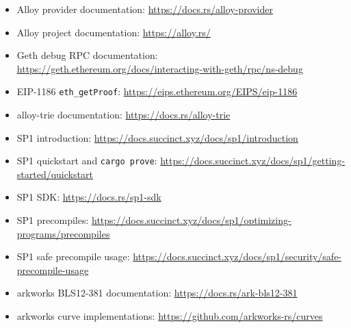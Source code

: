 \documentclass[UTF8,a4paper,11pt]{ctexart}
\begin{document}
\begin{itemize}[leftmargin=2em]
  \item Alloy provider documentation: \url{https://docs.rs/alloy-provider}
  \item Alloy project documentation: \url{https://alloy.rs/}
  \item Geth debug RPC documentation: \url{https://geth.ethereum.org/docs/interacting-with-geth/rpc/ns-debug}
  \item EIP-1186 \texttt{eth\_getProof}: \url{https://eips.ethereum.org/EIPS/eip-1186}
  \item alloy-trie documentation: \url{https://docs.rs/alloy-trie}
  \item SP1 introduction: \url{https://docs.succinct.xyz/docs/sp1/introduction}
  \item SP1 quickstart and \texttt{cargo prove}: \url{https://docs.succinct.xyz/docs/sp1/getting-started/quickstart}
  \item SP1 SDK: \url{https://docs.rs/sp1-sdk}
  \item SP1 precompiles: \url{https://docs.succinct.xyz/docs/sp1/optimizing-programs/precompiles}
  \item SP1 safe precompile usage: \url{https://docs.succinct.xyz/docs/sp1/security/safe-precompile-usage}
  \item arkworks BLS12-381 documentation: \url{https://docs.rs/ark-bls12-381}
  \item arkworks curve implementations: \url{https://github.com/arkworks-rs/curves}
\end{itemize}
\end{document}
